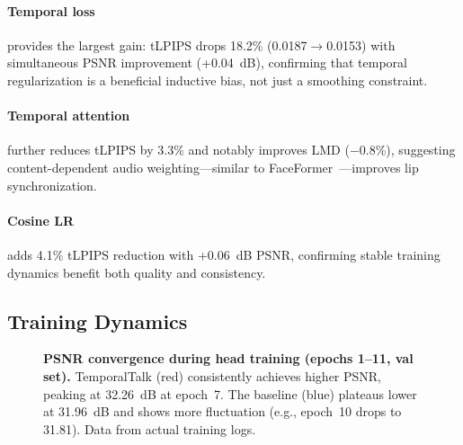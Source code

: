 \documentclass[10pt,twocolumn,letterpaper]{article}
\begin{document}
\paragraph{Temporal loss} provides the largest gain: tLPIPS drops 18.2\% (0.0187$\to$0.0153) with simultaneous PSNR improvement (+0.04~dB), confirming that temporal regularization is a beneficial inductive bias, not just a smoothing constraint.

\paragraph{Temporal attention} further reduces tLPIPS by 3.3\% and notably improves LMD ($-$0.8\%), suggesting content-dependent audio weighting---similar to FaceFormer~\cite{fan2022faceformer}---improves lip synchronization.

\paragraph{Cosine LR} adds 4.1\% tLPIPS reduction with +0.06~dB PSNR, confirming stable training dynamics benefit both quality and consistency.


\subsection{Training Dynamics}
\label{sec:training_dynamics}

\begin{figure}[t]
\centering
{}
\caption{\textbf{PSNR convergence during head training (epochs 1--11, val set).} TemporalTalk (red) consistently achieves higher PSNR, peaking at 32.26~dB at epoch~7. The baseline (blue) plateaus lower at 31.96~dB and shows more fluctuation (e.g., epoch~10 drops to 31.81). Data from actual training logs.}
\label{fig:training_psnr}
\end{figure}
\end{document}
